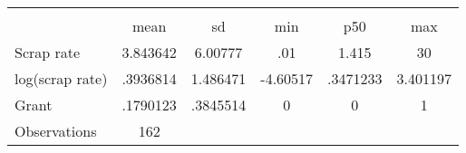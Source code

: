 \begin{tabular}{l*{1}{ccccc}}
\hline\hline
                    &\multicolumn{5}{c}{}                                            \\
                    &        mean&          sd&         min&         p50&         max\\
\hline
Scrap rate          &    3.843642&     6.00777&         .01&       1.415&          30\\
log(scrap rate)     &    .3936814&    1.486471&    -4.60517&    .3471233&    3.401197\\
Grant               &    .1790123&    .3845514&           0&           0&           1\\
\hline
Observations        &         162&            &            &            &            \\
\hline\end{tabular}
